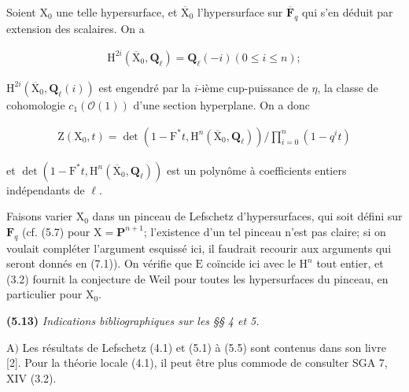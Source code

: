 \documentclass[10pt,leqno]{article}
\begin{document}
\noindent Soient \(\mathrm{X}_{0}\) une telle hypersurface, et \(\overline{\mathrm{X}}_{0}\) l’hypersurface sur \(\overline{\mathbf{F}}_{q}\) qui s’en déduit par extension des scalaires. On a\par

\begin{equation*}\begin{gathered}\mathrm{H}^{2i}(\overline{\mathrm{X}}_{0},\mathbf{Q}_{\ell })=\mathbf{Q}_{\ell }(- i)    (0\leq i\leq n);\end{gathered}\end{equation*}

\noindent \(\mathrm{H}^{2i}(\overline{\mathrm{X}}_{0},\mathbf{Q}_{\ell }(i))\) est engendré par la \(i\)-ième cup-puissance de \(\eta \), la classe de cohomologie \(c_{1}(\mathcal{O}(1))\) d’une section hyperplane. On a donc\par

\begin{equation*}\begin{gathered}\mathrm{Z}(\mathrm{X}_{0},t)=\operatorname{det}(1- \mathrm{F}^{*}t,\mathrm{H}^{n}(\overline{\mathrm{X}}_{0},\mathbf{Q}_{\ell })) / \prod _{i=0}^{n}(1- q^{i} t)\end{gathered}\end{equation*}

\noindent et \(\operatorname{det}(1- \mathrm{F}^{*}t,\mathrm{H}^{n}(\overline{\mathrm{X}}_{0},\mathbf{Q}_{\ell }))\) est un polynôme à coefficients entiers indépendants de \(\ell \).\par

\noindent Faisons varier \(\mathrm{X}_{0}\) dans un pinceau de Lefschetz d’hypersurfaces, qui soit défini sur \(\mathbf{F}_{q}\) (cf. (5.7) pour \(\mathrm{X}=\mathbf{P}^{n+1}\); l’existence d’un tel pinceau n’est pas claire; si on voulait compléter l’argument esquissé ici, il faudrait recourir aux arguments qui seront donnés en (7.1)). On vérifie que \(\mathrm{E}\) coïncide ici avec le \(\mathrm{H}^{n}\) tout entier, et (3.2) fournit la conjecture de Weil pour toutes les hypersurfaces du pinceau, en particulier pour \(\mathrm{X}_{0}\).\par

\noindent \textbf{(5.13)} \emph{Indications bibliographiques sur les §§ 4 et 5.}\par

\noindent \(\mathrm{A})\) Les résultats de Lefschetz (4.1) et (5.1) à (5.5) sont contenus dans son livre [2]. Pour la théorie locale (4.1), il peut être plus commode de consulter SGA 7, XIV (3.2).\par
\end{document}
